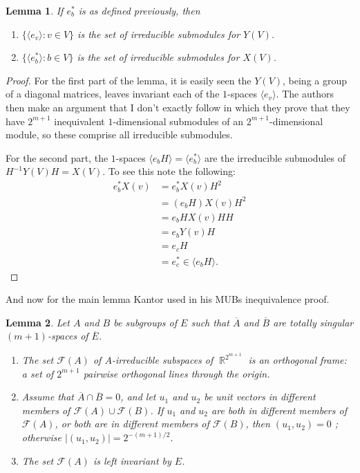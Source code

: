 \documentclass[a4paper]{article}
\DeclareMathOperator{\R}{\mathbb{R}}
\newtheorem{lemma}{Lemma}
\begin{document}
  \begin{lemma}
    If $e_b^{*}$ is as defined previously, then
    \begin{enumerate}
      \item $\{\langle e_v \rangle : v \in V\}$ is the set
        of irreducible submodules for $Y(V)$.
      \item $\{\langle e_b^{*} \rangle : b \in V\}$ is the
        set of irreducible submodules for $X(V)$.
    \end{enumerate}
  \end{lemma}
  \begin{proof}
    For the first part of the lemma, it is easily seen the
    $Y(V)$, being a group of a diagonal matrices, leaves
    invariant each of the $1$-spaces $\langle e_v \rangle$.
    The authors then make an argument that I don't exactly
    follow in which they prove that they have $2^{m+1}$ 
    inequivalent $1$-dimensional submodules of an
    $2^{m+1}$-dimensional module, so these comprise all
    irreducible submodules.

    For the second part, the $1$-spaces $\langle e_b H
    \rangle = \langle e_b^{*} \rangle$ are the irreducible
    submodules of $H^{-1}Y(V)H = X(V)$. To see this note the
    following:
    \begin{align*}
      e_b^{*} X(v) 
      &= e_b^{*} X(v) H^2 \\
      &= \left(e_b H\right) X(v) H^2 \\
      &= e_b H X(v) H H \\
      &= e_b Y(v) H \\
      &= e_c H \\
      &= e_c^{*} \in \langle e_b H \rangle.
    \end{align*} 
  \end{proof}

  And now for the main lemma Kantor used in his MUBs
  inequivalence proof.
  \begin{lemma}
    Let $A$ and $B$ be subgroups of $E$ such that
    $\overline{A}$ and $\overline{B}$ are totally singular
    $(m+1)$-spaces of $\overline{E}$.
    \begin{enumerate}
      \item The set $\mathcal F(A)$ of $A$-irreducible
        subspaces of $\R^{2^{m+1}}$ is an orthogonal frame:
        a set of $2^{m+1}$ pairwise orthogonal lines through
        the origin.
      \item Assume that $\overline{A} \cap \overline{B} =
        0$, and let $u_1$ and $u_2$ be unit vectors in
        different members of $\mathcal F(A) \cup \mathcal
        F(B)$. If $u_1$ and $u_2$ are both in different
        members of $\mathcal F(A)$, or both are in different
        members of $\mathcal F(B)$, then $(u_1,u_2) = 0$ ;
        otherwise $|(u_1,u_2)| = 2^{-(m+1) / 2}$.
      \item The set $\mathcal F(A)$ is left invariant by
        $E$.
    \end{enumerate}
  \end{lemma}
 
\end{document}
